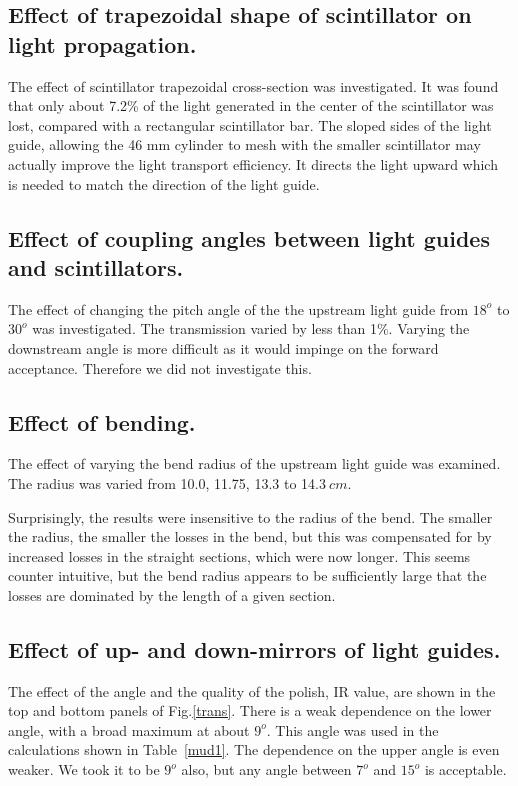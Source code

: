 \subsection{Effect of trapezoidal shape of scintillator on light propagation.}
\label{mu1}
The effect of scintillator trapezoidal cross-section was investigated. 
It was found that only about 7.2\% of the light generated in the center of the scintillator was lost, compared with a rectangular scintillator bar. 
The sloped sides of the light guide, allowing the 46 mm cylinder to mesh with the smaller scintillator may actually improve the light transport efficiency. It directs the light upward which is needed to match the direction of the light guide. 
\subsection{Effect of coupling angles between light guides and scintillators.}
\label{mu2}
The effect of changing the pitch angle of the the upstream light guide from $18^o$ to $30^o$ was investigated. The transmission varied by less than 1\%.
Varying the downstream angle is more difficult as it would impinge on the forward acceptance.
Therefore we did not investigate this.

\subsection{Effect of bending.}
\label{mu3}
The effect of varying the bend radius of the upstream light guide was examined.
The radius was varied from 10.0, 11.75, 13.3 to 14.$3~cm$. 

Surprisingly, the results were insensitive to the radius of the bend.
The smaller the radius, the smaller the losses in the bend, but this was compensated for by increased losses in the straight sections, which were now longer.
This seems counter intuitive, but the bend radius appears to be sufficiently large that the losses are dominated by the length of a given section.  

\subsection{Effect of up- and down-mirrors of light guides.}
\label{mu4}
The effect of the angle and the quality of the polish, IR value, are shown in the top and bottom panels of Fig.\ref{trans}.
There is a weak dependence on the lower angle, with a broad maximum at about $9^o$. 
This angle was used in the calculations shown in Table~\ref{mud1}.
The dependence on the upper angle is even weaker. We took it to be $9^o$ also, but any angle between $7^o$ and $15^o$ is acceptable. 

